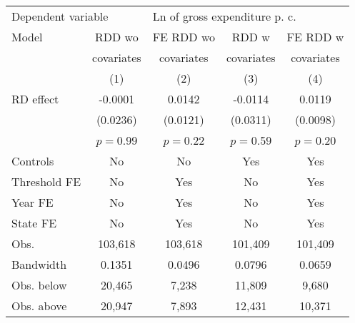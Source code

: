 \begin{tabular}{lcccc}
  \toprule
 \midrule
\multicolumn{2}{l}{Dependent variable} & \multicolumn{3}{l}{Ln of gross expenditure \acs{p. c.}} \\ 
 Model & \acs{RDD} \acs{wo} & \acs{FE} \acs{RDD} \acs{wo} & \acs{RDD} \acs{w} & \acs{FE} \acs{RDD} \acs{w} \\
   & covariates & covariates & covariates & covariates \\
   & (1) & (2) & (3) & (4) \\ 
   \midrule
\ac{RD} effect & -0.0001 & 0.0142 & -0.0114 & 0.0119 \\ 
   & (0.0236) & (0.0121) & (0.0311) & (0.0098) \\ 
   & $p=$0.99 & $p=$0.22 & $p=$0.59 & $p=$0.20 \\ 
   \midrule
Controls & No & No & Yes & Yes \\ 
  Threshold \acs{FE} & No & Yes & No & Yes \\ 
  Year \acs{FE} & No & Yes & No & Yes \\ 
  State \acs{FE} & No & Yes & No & Yes \\ 
   \midrule
\acs{Obs.} & 103,618 & 103,618 & 101,409 & 101,409 \\ 
  Bandwidth & 0.1351 & 0.0496 & 0.0796 & 0.0659 \\ 
  \acs{Obs.} below & 20,465 & 7,238 & 11,809 & 9,680 \\ 
  \acs{Obs.} above & 20,947 & 7,893 & 12,431 & 10,371 \\ 
   \midrule
 \bottomrule
\end{tabular}
